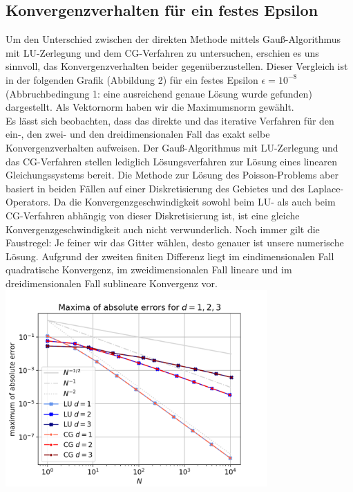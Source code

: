 \documentclass{scrartcl}
\begin{document}
\subsection{Konvergenzverhalten für ein festes Epsilon}
Um den Unterschied zwischen der direkten Methode mittels Gauß-Algorithmus mit LU-Zerlegung und dem CG-Verfahren zu untersuchen, erschien es uns sinnvoll, das Konvergenzverhalten beider gegenüberzustellen.
Dieser Vergleich ist in der folgenden Grafik (Abbildung 2) für ein festes Epsilon $\epsilon = 10^{-8}$ (Abbruchbedingung 1: eine ausreichend genaue Lösung wurde gefunden) dargestellt.
Als Vektornorm haben wir die Maximumsnorm gewählt. \\
Es lässt sich beobachten, dass das direkte und das iterative Verfahren für den ein-, den zwei- und den dreidimensionalen Fall das exakt selbe Konvergenzverhalten aufweisen.
Der Gauß-Algorithmus mit LU-Zerlegung und das CG-Verfahren stellen lediglich Lösungsverfahren zur Lösung eines linearen Gleichungssystems bereit.
Die Methode zur Lösung des Poisson-Problems aber basiert in beiden Fällen auf einer Diskretisierung des Gebietes und des Laplace-Operators.
Da die Konvergenzgeschwindigkeit sowohl beim LU- als auch beim CG-Verfahren abhängig von dieser Diskretisierung ist, ist eine gleiche Konvergenzgeschwindigkeit auch nicht verwunderlich.
Noch immer gilt die Faustregel: Je feiner wir das Gitter wählen, desto genauer ist unsere numerische Lösung.
Aufgrund der zweiten finiten Differenz liegt im eindimensionalen Fall quadratische Konvergenz, im zweidimensionalen Fall lineare und im dreidimensionalen Fall sublineare Konvergenz vor. \\


{
  \centering
    \includegraphics[width=0.75\textwidth]{Grafiken/compare}
    \vspace{-0.2cm}
}
\vspace{0.5cm}
\end{document}
